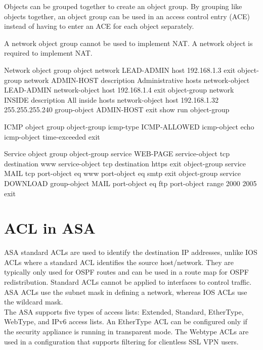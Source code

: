 Objects can be grouped together to create an object group. By grouping like objects together, an object group can be used in an access control entry (ACE) instead of having to enter an ACE for each object separately.

\note  A network object group cannot be used to implement NAT. A network object is required to implement NAT.

\begin{sexylisting}{Network object group}
object network LEAD-ADMIN
	host 192.168.1.3
	exit
object-group network ADMIN-HOST
	description Administrative hosts
	network-object LEAD-ADMIN
	network-object host 192.168.1.4
	exit
object-group network INSIDE
	description All inside hosts
	network-object host 192.168.1.32 255.255.255.240
	group-object ADMIN-HOST
	exit
show run object-group		
\end{sexylisting}

\begin{sexylisting}{ICMP object group}
object-group icmp-type ICMP-ALLOWED
	icmp-object echo
	icmp-object time-exceeded
	exit
\end{sexylisting}

\begin{sexylisting}{Service object group}
object-group service WEB-PAGE
	service-object tcp destination www
	service-object tcp destination https
	exit
object-group service MAIL tcp
	port-object eq www
	port-object eq smtp
	exit	
object-group service DOWNLOAD
	group-object MAIL
	port-object eq ftp
	port-object range 2000 2005
	exit	
\end{sexylisting}


\section{ACL in ASA}

ASA standard ACLs are used to identify the destination IP addresses, unlike IOS ACLs where a standard ACL identifies the source host/network. They are typically only used for OSPF routes and can be used in a route map for OSPF redistribution. Standard ACLs cannot be applied to interfaces to control traffic.\\

ASA ACLs use the subnet mask in defining a network, whereas IOS ACLs use the wildcard mask.\\

The ASA supports five types of access lists: Extended, Standard, EtherType, WebType, and IPv6 access lists. An EtherType ACL can be configured only if the security appliance is running in transparent mode. The Webtype ACLs are used in a configuration that supports filtering for clientless SSL VPN users.\\

